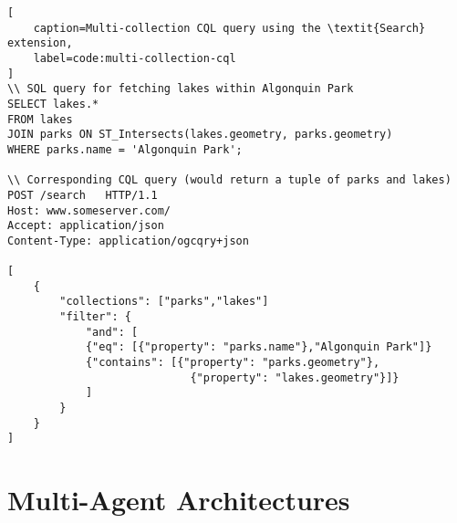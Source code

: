 \begin{lstlisting}[
    caption=Multi-collection CQL query using the \textit{Search} extension,
    label=code:multi-collection-cql
]
\\ SQL query for fetching lakes within Algonquin Park
SELECT lakes.*
FROM lakes
JOIN parks ON ST_Intersects(lakes.geometry, parks.geometry)
WHERE parks.name = 'Algonquin Park';

\\ Corresponding CQL query (would return a tuple of parks and lakes)
POST /search   HTTP/1.1                                           
Host: www.someserver.com/                                         
Accept: application/json                                          
Content-Type: application/ogcqry+json                             
                                                                    
[                                                                 
    {                                                              
        "collections": ["parks","lakes"]                            
        "filter": {                                                 
            "and": [                                                 
            {"eq": [{"property": "parks.name"},"Algonquin Park"]} 
            {"contains": [{"property": "parks.geometry"},         
                            {"property": "lakes.geometry"}]}        
            ]                                                        
        }                                                           
    }                                                              
]
\end{lstlisting}


\section{Multi-Agent Architectures}
\label{sec:multi-agent-architectures}